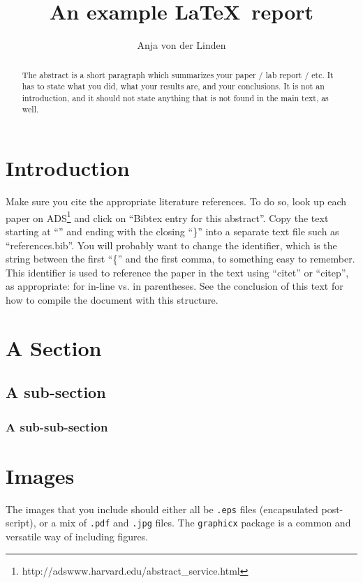\documentclass[preprint]{aastex61}
\begin{document}
\title{An example \LaTeX\ report}

\author{Anja von der Linden}

\begin{abstract}
The abstract is a short paragraph which summarizes your paper / lab report / etc. It has to state what you did, what your results are, and your conclusions.  It is not an introduction, and it should not state anything that is not found in the main text, as well.
\end{abstract}

\section{Introduction}

Make sure you cite the appropriate literature references.  To do so, look up each paper on ADS\footnote{http://adswww.harvard.edu/abstract\_service.html} and click on ``Bibtex entry for this abstract''.  Copy the text starting at ``\@'' and ending with the closing ``\}'' into a separate text file such as ``references.bib''.  You will probably want to change the identifier, which is the string between the first ``\{'' and the first comma, to something easy to remember.  This identifier is used to reference the paper in the text using ``citet'' or ``citep'', as appropriate: \citet{vdL14} for in-line vs. \citep{vdL14} in parentheses.  See the conclusion of this text for how to compile the document with this structure.

\section{A Section}

\subsection{A sub-section}

\subsubsection{A sub-sub-section}

\section{Images}

The images that you include should either all be {\tt .eps} files (encapsulated post-script), or a mix of {\tt .pdf} and {\tt .jpg} files.  The {\tt graphicx} package is a common and versatile way of including figures.
\end{document}
